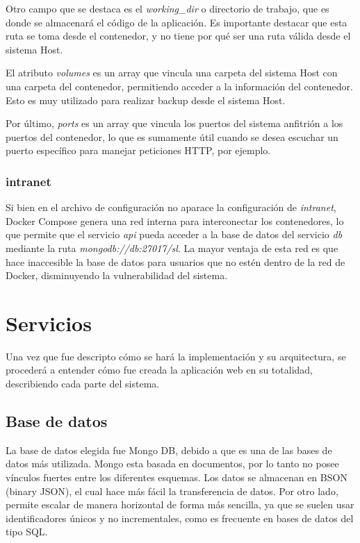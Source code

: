 Otro campo que se destaca es el \textit{working\_dir} o directorio de trabajo, que es donde se almacenará el código de la aplicación. Es importante destacar que esta ruta se toma desde el contenedor, y no tiene por qué ser una ruta válida desde el sistema Host.

El atributo \textit{volumes} es un array que vincula una carpeta del sistema Host con una carpeta del contenedor, permitiendo acceder a la información del contenedor.
Esto es muy utilizado para realizar backup desde el sistema Host.

Por último, \textit{ports} es un array que vincula los puertos del sistema anfitrión a los puertos del contenedor, lo que es sumamente útil cuando se desea escuchar un puerto específico para manejar peticiones HTTP, por ejemplo.

\subsubsection{intranet}

Si bien en el archivo de configuración no aparace la configuración de \textit{intranet}, Docker Compose genera una red interna para interconectar los contenedores, lo que permite que el servicio \textit{api} pueda acceder a la base de datos del servicio \textit{db} mediante la ruta \textit{mongodb://db:27017/sl}. La mayor ventaja de esta red es que hace inaccesible la base de datos para usuarios que no estén dentro de la red de Docker, disminuyendo la vulnerabilidad del sistema.


\section{Servicios}

Una vez que fue descripto cómo se hará la implementación y su arquitectura, se procederá a entender cómo fue creada la aplicación web en su totalidad, describiendo cada parte del sistema.

\subsection{Base de datos}

La base de datos elegida fue Mongo DB, debido a que es una de las bases de datos más utilizada. Mongo esta basada en documentos, por lo tanto no posee vínculos fuertes entre los diferentes esquemas.
Los datos se almacenan en BSON (binary JSON), el cual hace más fácil la transferencia de datos. Por otro lado, permite escalar de manera horizontal de forma más sencilla, ya que se suelen usar identificadores únicos y no incrementales, como es frecuente en bases de datos del tipo SQL.

